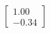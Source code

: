 \documentclass[preview]{standalone}
\begin{document}
\begin{align*}
\begin{bmatrix} 1.00 \\ -0.34 \end{bmatrix}
\end{align*}
\end{document}
